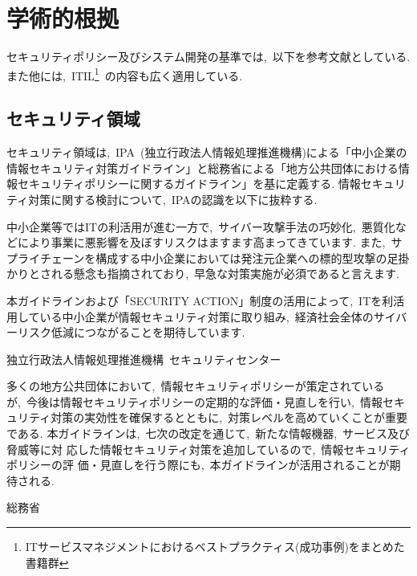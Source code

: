 \section{学術的根拠}
セキュリティポリシー及びシステム開発の基準では,~以下を参考文献としている.
また他には,~ITIL\footnote{ITサービスマネジメントにおけるベストプラクティス(成功事例)をまとめた書籍群}~の内容も広く適用している.

\subsection{セキュリティ領域}
セキュリティ領域は,~IPA~(独立行政法人情報処理推進機構)による「中小企業の情報セキュリティ対策ガイドライン」と総務省による「地方公共団体における情報セキュリティポリシーに関するガイドライン」を基に定義する.
情報セキュリティ対策に関する検討について,~IPAの認識を以下に抜粋する.
\begin{shadebox}
    中小企業等ではITの利活用が進む一方で,~サイバー攻撃手法の巧妙化,~悪質化などにより事業に悪影響を及ぼすリスクはますます高まってきています.
    また,~サプライチェーンを構成する中小企業においては発注元企業への標的型攻撃の足掛かりとされる懸念も指摘されており,~早急な対策実施が必須であると言えます.
    \par
    本ガイドラインおよび「SECURITY ACTION」制度の活用によって,~ITを利活用している中小企業が情報セキュリティ対策に取り組み,~経済社会全体のサイバーリスク低減につながることを期待しています.

    \hfill 独立行政法人情報処理推進機構~セキュリティセンター
\end{shadebox}

\begin{shadebox}
    多くの地方公共団体において,~情報セキュリティポリシーが策定されているが,~今後は情報セキュリティポリシーの定期的な評価・見直しを行い,~情報セキュリティ対策の実効性を確保するとともに,~対策レベルを高めていくことが重要である.
    本ガイドラインは,~七次の改定を通じて,~新たな情報機器,~サービス及び脅威等に対
    応した情報セキュリティ対策を追加しているので,~情報セキュリティポリシーの評
    価・見直しを行う際にも,~本ガイドラインが活用されることが期待される.

    \hfill 総務省
\end{shadebox}

